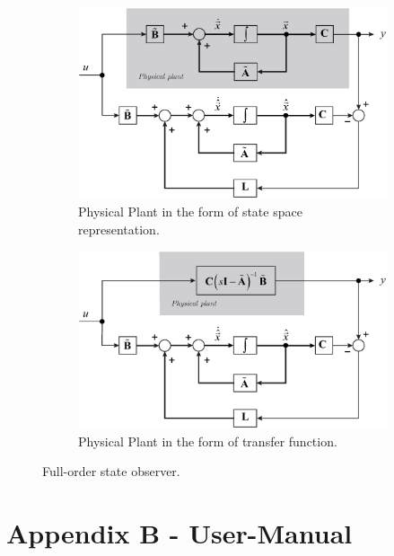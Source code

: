 \documentclass[11pt,a4paper,oneside]{book}
\numberwithin{equation}{section}
\theoremstyle{it}
\theoremstyle{definition}
\begin{document}
\begin{figure}[H]
	\centering
	\begin{subfigure}{.75\textwidth}
		\centering
		\includegraphics[width = 340pt, 
		keepaspectratio]{figures/state_observer_1.eps}
		\captionsetup{width = 0.5\textwidth, font=footnotesize}
		\caption{Physical Plant in the form of state space representation.}
		\label{figure_state_observer1}
	\end{subfigure}	
	\begin{subfigure}{.75\textwidth}
		\centering
		\includegraphics[width = 340pt, 
		keepaspectratio]{figures/state_observer_2.eps}
		\captionsetup{width = 0.5\textwidth,font=footnotesize}
		\caption{Physical Plant in the form of transfer function.}
		\label{figure_state_observer2}
	\end{subfigure}
	\captionsetup{width = 0.5\textwidth,font=small}
	\caption{Full-order state observer.}
	\label{figure_state_observer}
\end{figure}


\chapter{Appendix B - User-Manual}
\end{document}
